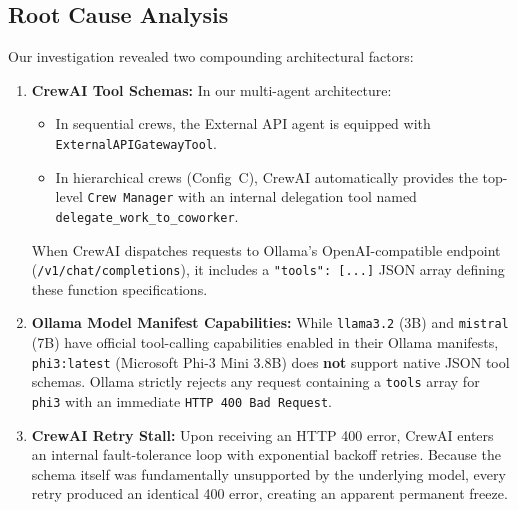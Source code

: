 \documentclass[10pt,a4paper]{article}
\begin{document}
\subsection{Root Cause Analysis}
Our investigation revealed two compounding architectural factors:
\begin{enumerate}
    \item \textbf{CrewAI Tool Schemas:} In our multi-agent architecture:
    \begin{itemize}
        \item In sequential crews, the External API agent is equipped with \texttt{ExternalAPIGatewayTool}.
        \item In hierarchical crews (Config~C), CrewAI automatically provides the top-level \texttt{Crew Manager} with an internal delegation tool named \texttt{delegate\_work\_to\_coworker}.
    \end{itemize}
    When CrewAI dispatches requests to Ollama's OpenAI-compatible endpoint (\texttt{/v1/chat/completions}), it includes a \texttt{"tools": [...]} JSON array defining these function specifications.
    
    \item \textbf{Ollama Model Manifest Capabilities:} While \texttt{llama3.2} (3B) and \texttt{mistral} (7B) have official tool-calling capabilities enabled in their Ollama manifests, \texttt{phi3:latest} (Microsoft Phi-3 Mini 3.8B) does \textbf{not} support native JSON tool schemas. Ollama strictly rejects any request containing a \texttt{tools} array for \texttt{phi3} with an immediate \texttt{HTTP 400 Bad Request}.

    \item \textbf{CrewAI Retry Stall:} Upon receiving an HTTP 400 error, CrewAI enters an internal fault-tolerance loop with exponential backoff retries. Because the schema itself was fundamentally unsupported by the underlying model, every retry produced an identical 400 error, creating an apparent permanent freeze.
\end{enumerate}
\end{document}
